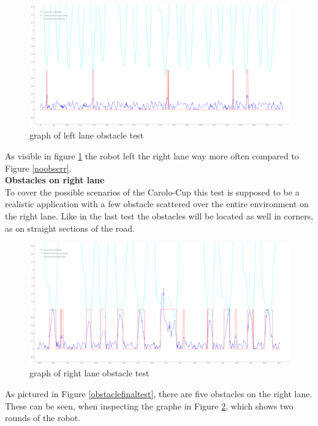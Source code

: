 \begin{figure}[H]
	\includegraphics[width=\textwidth]{Pictures/left obs final obs2}
	\caption{graph of left lane obstacle test}
	\label{leftobsfinal}
\end{figure}
As visible in figure \ref{leftobsfinal} the robot left the right lane way more often compared to Figure \ref{noobserr}.\\

\textbf{Obstacles on right lane}\\

To cover the possible scenarios of the Carolo-Cup this test is supposed to be a realistic application with a few obstacle scattered over the entire environment on the right lane. Like in the last test the obstacles will be located as well in corners, as on straight sections of the road.

\begin{figure}[H]
	\includegraphics[width=\textwidth]{Pictures/right obs final obs}
	\caption{graph of right lane obstacle test}
	\label{rightobsfinal}
\end{figure}


As pictured in Figure \ref{obstaclefinaltest}, there are five obstacles on the right lane. These can be seen, when inspecting the graphe in Figure \ref{rightobsfinal}, which shows two rounds of the robot.


